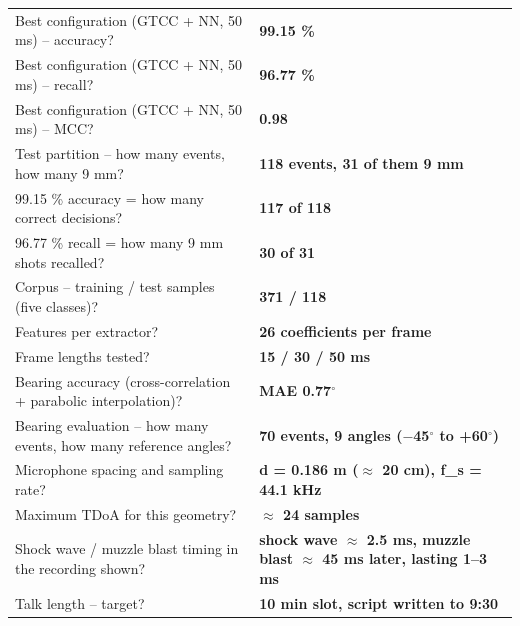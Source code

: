 \documentclass[11pt,a4paper]{article}
\begin{document}
\medskip
\begin{tabular}{@{}p{} p{}@{}}
  \toprule
    Best configuration (GTCC + NN, 50 ms) – accuracy? & \textbf{99.15 \%}\\
    Best configuration (GTCC + NN, 50 ms) – recall? & \textbf{96.77 \%}\\
    Best configuration (GTCC + NN, 50 ms) – MCC? & \textbf{0.98}\\
    Test partition – how many events, how many 9 mm? & \textbf{118 events, 31 of them 9 mm}\\
    99.15 \% accuracy = how many correct decisions? & \textbf{117 of 118}\\
    96.77 \% recall = how many 9 mm shots recalled? & \textbf{30 of 31}\\
    Corpus – training / test samples (five classes)? & \textbf{371 / 118}\\
    Features per extractor? & \textbf{26 coefficients per frame}\\
    Frame lengths tested? & \textbf{15 / 30 / 50 ms}\\
    Bearing accuracy (cross-correlation + parabolic interpolation)? & \textbf{MAE 0.77$^\circ$}\\
    Bearing evaluation – how many events, how many reference angles? & \textbf{70 events, 9 angles ($-$45$^\circ$ to +60$^\circ$)}\\
    Microphone spacing and sampling rate? & \textbf{d = 0.186 m ($\approx$ 20 cm), f\_s = 44.1 kHz}\\
    Maximum TDoA for this geometry? & \textbf{$\approx$ 24 samples}\\
    Shock wave / muzzle blast timing in the recording shown? & \textbf{shock wave $\approx$ 2.5 ms, muzzle blast $\approx$ 45 ms later, lasting 1–3 ms}\\
    Talk length – target? & \textbf{10 min slot, script written to 9:30}\\
  \bottomrule
\end{tabular}
\end{document}
